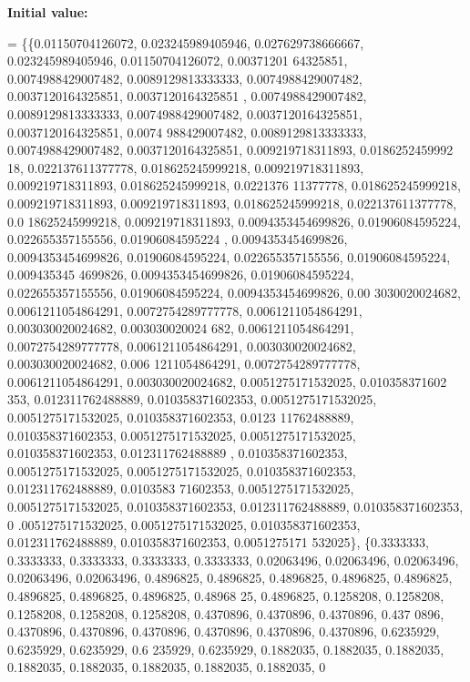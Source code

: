 {\bfseries Initial value\+:}
\begin{DoxyCode}
= \{\{0.01150704126072, 0.023245989405946, 0.027629738666667, 0.023245989405946, 0.01150704126072, 0.00371201
      64325851, 0.0074988429007482, 0.0089129813333333, 0.0074988429007482, 0.0037120164325851, 0.0037120164325851
      , 0.0074988429007482, 0.0089129813333333, 0.0074988429007482, 0.0037120164325851, 0.0037120164325851, 0.0074
      988429007482, 0.0089129813333333, 0.0074988429007482, 0.0037120164325851, 0.009219718311893, 0.0186252459992
      18, 0.022137611377778, 0.018625245999218, 0.009219718311893, 0.009219718311893, 0.018625245999218, 0.0221376
      11377778, 0.018625245999218, 0.009219718311893, 0.009219718311893, 0.018625245999218, 0.022137611377778, 0.0
      18625245999218, 0.009219718311893, 0.0094353454699826, 0.01906084595224, 0.022655357155556, 0.01906084595224
      , 0.0094353454699826, 0.0094353454699826, 0.01906084595224, 0.022655357155556, 0.01906084595224, 0.009435345
      4699826, 0.0094353454699826, 0.01906084595224, 0.022655357155556, 0.01906084595224, 0.0094353454699826, 0.00
      3030020024682, 0.0061211054864291, 0.0072754289777778, 0.0061211054864291, 0.003030020024682, 0.003030020024
      682, 0.0061211054864291, 0.0072754289777778, 0.0061211054864291, 0.003030020024682, 0.003030020024682, 0.006
      1211054864291, 0.0072754289777778, 0.0061211054864291, 0.003030020024682, 0.0051275171532025, 0.010358371602
      353, 0.012311762488889, 0.010358371602353, 0.0051275171532025, 0.0051275171532025, 0.010358371602353, 0.0123
      11762488889, 0.010358371602353, 0.0051275171532025, 0.0051275171532025, 0.010358371602353, 0.012311762488889
      , 0.010358371602353, 0.0051275171532025, 0.0051275171532025, 0.010358371602353, 0.012311762488889, 0.0103583
      71602353, 0.0051275171532025, 0.0051275171532025, 0.010358371602353, 0.012311762488889, 0.010358371602353, 0
      .0051275171532025, 0.0051275171532025, 0.010358371602353, 0.012311762488889, 0.010358371602353, 0.0051275171
      532025\},
    \{0.3333333, 0.3333333, 0.3333333, 0.3333333, 0.3333333, 0.02063496, 0.02063496, 0.02063496, 0.02063496,
       0.02063496, 0.4896825, 0.4896825, 0.4896825, 0.4896825, 0.4896825, 0.4896825, 0.4896825, 0.4896825, 0.48968
      25, 0.4896825, 0.1258208, 0.1258208, 0.1258208, 0.1258208, 0.1258208, 0.4370896, 0.4370896, 0.4370896, 0.437
      0896, 0.4370896, 0.4370896, 0.4370896, 0.4370896, 0.4370896, 0.4370896, 0.6235929, 0.6235929, 0.6235929, 0.6
      235929, 0.6235929, 0.1882035, 0.1882035, 0.1882035, 0.1882035, 0.1882035, 0.1882035, 0.1882035, 0.1882035, 0

\end{DoxyCode}
